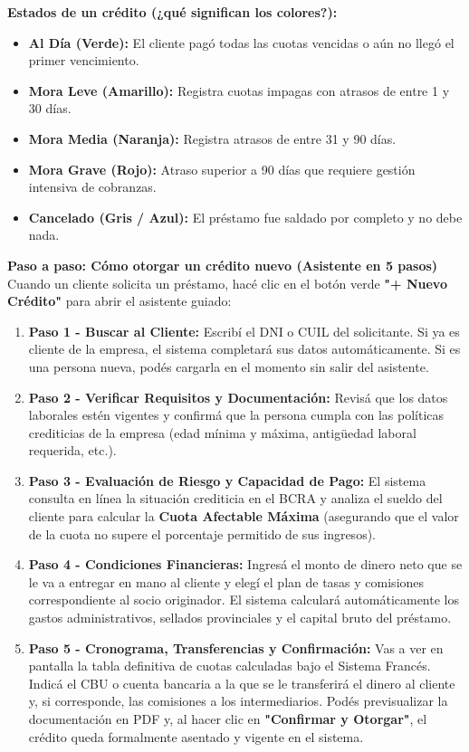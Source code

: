 \documentclass[12pt,a4paper]{article}
\renewcommand{\_}{\textunderscore\allowbreak}
\begin{document}
\textbf{Estados de un crédito (¿qué significan los colores?):}
\begin{itemize}
    \item \textbf{Al Día (Verde):} El cliente pagó todas las cuotas vencidas o aún no llegó el primer vencimiento.
    \item \textbf{Mora Leve (Amarillo):} Registra cuotas impagas con atrasos de entre 1 y 30 días.
    \item \textbf{Mora Media (Naranja):} Registra atrasos de entre 31 y 90 días.
    \item \textbf{Mora Grave (Rojo):} Atraso superior a 90 días que requiere gestión intensiva de cobranzas.
    \item \textbf{Cancelado (Gris / Azul):} El préstamo fue saldado por completo y no debe nada.
\end{itemize}

\textbf{Paso a paso: Cómo otorgar un crédito nuevo (Asistente en 5 pasos)}
Cuando un cliente solicita un préstamo, hacé clic en el botón verde \textbf{"+ Nuevo Crédito"} para abrir el asistente guiado:
\begin{enumerate}
    \item \textbf{Paso 1 - Buscar al Cliente:} Escribí el DNI o CUIL del solicitante. Si ya es cliente de la empresa, el sistema completará sus datos automáticamente. Si es una persona nueva, podés cargarla en el momento sin salir del asistente.
    \item \textbf{Paso 2 - Verificar Requisitos y Documentación:} Revisá que los datos laborales estén vigentes y confirmá que la persona cumpla con las políticas crediticias de la empresa (edad mínima y máxima, antigüedad laboral requerida, etc.).
    \item \textbf{Paso 3 - Evaluación de Riesgo y Capacidad de Pago:} El sistema consulta en línea la situación crediticia en el BCRA y analiza el sueldo del cliente para calcular la \textbf{Cuota Afectable Máxima} (asegurando que el valor de la cuota no supere el porcentaje permitido de sus ingresos).
    \item \textbf{Paso 4 - Condiciones Financieras:} Ingresá el monto de dinero neto que se le va a entregar en mano al cliente y elegí el plan de tasas y comisiones correspondiente al socio originador. El sistema calculará automáticamente los gastos administrativos, sellados provinciales y el capital bruto del préstamo.
    \item \textbf{Paso 5 - Cronograma, Transferencias y Confirmación:} Vas a ver en pantalla la tabla definitiva de cuotas calculadas bajo el Sistema Francés. Indicá el CBU o cuenta bancaria a la que se le transferirá el dinero al cliente y, si corresponde, las comisiones a los intermediarios. Podés previsualizar la documentación en PDF y, al hacer clic en \textbf{"Confirmar y Otorgar"}, el crédito queda formalmente asentado y vigente en el sistema.
\end{enumerate}
\end{document}
